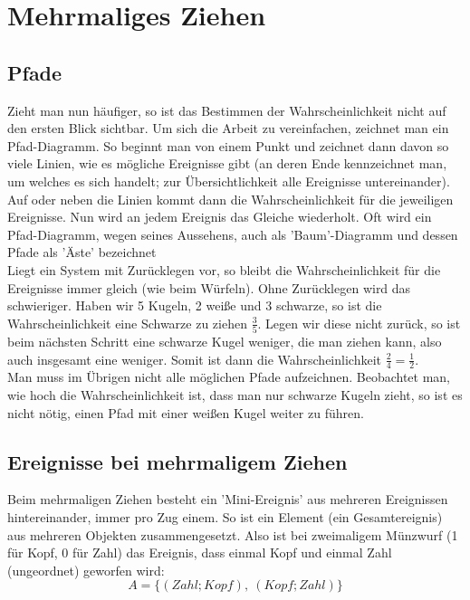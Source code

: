 \section{Mehrmaliges Ziehen}

	\subsection{Pfade}
		Zieht man nun häufiger, so ist das Bestimmen der Wahrscheinlichkeit nicht auf
		den ersten Blick sichtbar. Um sich die Arbeit zu vereinfachen, zeichnet man
		ein Pfad-Diagramm. So beginnt man von einem Punkt und zeichnet dann davon so
		viele Linien, wie es mögliche Ereignisse gibt (an deren Ende kennzeichnet man,
		um welches es sich handelt; zur Übersichtlichkeit alle Ereignisse
		untereinander). Auf oder neben die Linien kommt dann die Wahrscheinlichkeit
		für die jeweiligen Ereignisse. Nun wird an jedem Ereignis das Gleiche
		wiederholt. Oft wird ein Pfad-Diagramm, wegen seines Aussehens, auch als
		'Baum'-Diagramm und dessen Pfade als 'Äste' bezeichnet\\
		Liegt ein System mit Zurücklegen vor, so bleibt die Wahrscheinlichkeit für die
		Ereignisse immer gleich (wie beim Würfeln). Ohne Zurücklegen wird das
		schwieriger. Haben wir 5 Kugeln, 2 weiße und 3 schwarze, so ist die
		Wahrscheinlichkeit eine Schwarze zu ziehen \(\frac{3}{5}\). Legen wir diese
		nicht zurück, so ist beim nächsten Schritt eine schwarze Kugel weniger, die
		man ziehen kann, also auch insgesamt eine weniger. Somit ist dann die
		Wahrscheinlichkeit \(\frac{2}{4}=\frac{1}{2}\).\\
		Man muss im Übrigen nicht alle möglichen Pfade aufzeichnen. Beobachtet man,
		wie hoch die Wahrscheinlichkeit ist, dass man nur schwarze Kugeln zieht, so
		ist es nicht nötig, einen Pfad mit einer weißen Kugel weiter zu führen.

	\subsection{Ereignisse bei mehrmaligem Ziehen}
		Beim mehrmaligen Ziehen besteht ein 'Mini-Ereignis' aus mehreren Ereignissen
		hintereinander, immer pro Zug einem. So ist ein Element (ein Gesamtereignis)
		aus mehreren Objekten zusammengesetzt. Also ist bei zweimaligem Münzwurf (1
		für Kopf, 0 für Zahl) das Ereignis, dass einmal Kopf und einmal Zahl
		(ungeordnet) geworfen wird:
		\[A=\lbrace (Zahl;Kopf),\ (Kopf;Zahl)\rbrace\]

